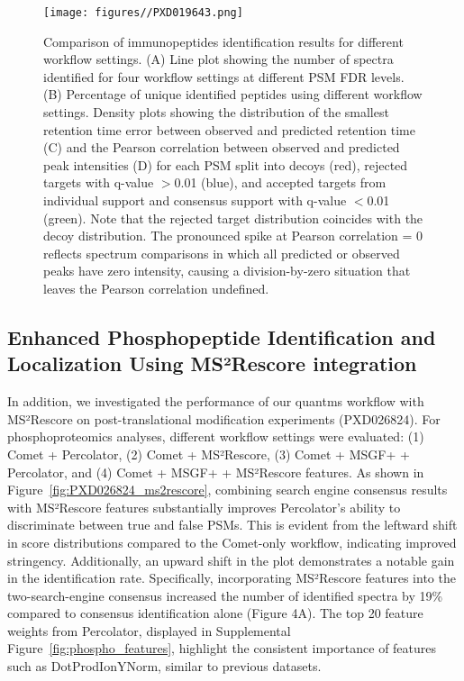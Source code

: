 \documentclass[12pt]{article}
\begin{document}

\begin{figure}[ht!]
	\centering
	\texttt{[image: figures//PXD019643.png]}
	\caption{Comparison of immunopeptides identification results for different workflow settings. (A) Line plot showing the number of spectra identified for four workflow settings at different PSM FDR levels. (B) Percentage of unique identified peptides using different workflow settings. Density plots showing the distribution of the smallest retention time error between observed and predicted retention time (C) and the Pearson correlation between observed and predicted peak intensities (D) for each PSM split into decoys (red), rejected targets with q-value $>$0.01 (blue), and accepted targets from individual support and consensus support with q-value $<$0.01 (green). Note that the rejected target distribution coincides with the decoy distribution. The pronounced spike at Pearson correlation = 0 reflects spectrum comparisons in which all predicted or observed peaks have zero intensity, causing a division-by-zero situation that leaves the Pearson correlation undefined.}
	\label{fig:PXD019643_immunopeptides}
\end{figure}

\subsection{Enhanced Phosphopeptide Identification and Localization Using MS²Rescore integration}
In addition, we investigated the performance of our quantms workflow with MS²Rescore on post-translational modification experiments (PXD026824). For phosphoproteomics analyses, different workflow settings were evaluated: (1) Comet + Percolator, (2) Comet + MS²Rescore, (3) Comet + MSGF+ + Percolator, and (4) Comet + MSGF+ + MS²Rescore features. As shown in Figure~\ref{fig:PXD026824_ms2rescore}, combining search engine consensus results with MS²Rescore features substantially improves Percolator's ability to discriminate between true and false PSMs. This is evident from the leftward shift in score distributions compared to the Comet-only workflow, indicating improved stringency. %
Additionally, an upward shift in the plot demonstrates a notable gain in the identification rate. %
Specifically, incorporating MS²Rescore features into the two-search-engine consensus increased the number of identified spectra by 19\% compared to consensus identification alone (Figure 4A). The top 20 feature weights from Percolator, displayed in Supplemental Figure~\ref{fig:phospho_features}, highlight the consistent importance of features such as DotProdIonYNorm, similar to previous datasets.
\end{document}
